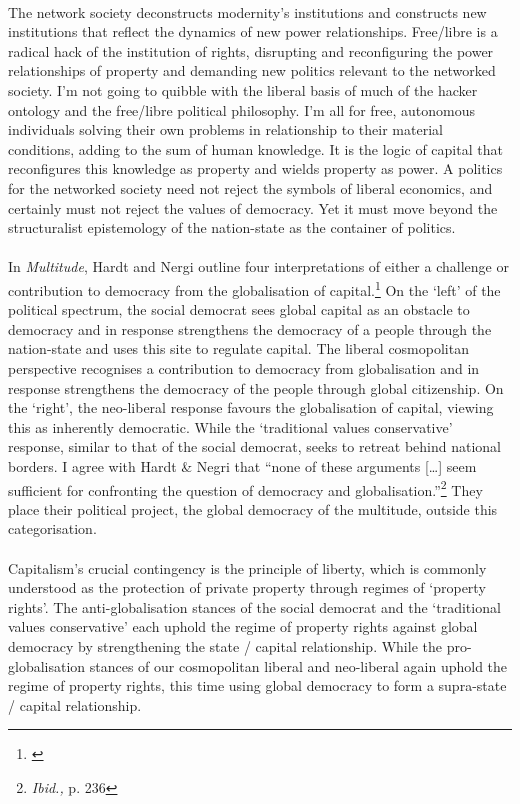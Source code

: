 \documentclass[11pt,titlepage]{book}
\begin{document}
\paragraph{}The network society deconstructs modernity's institutions and constructs new institutions that reflect the dynamics of new power relationships. Free/libre is a radical hack of the institution of rights, disrupting and reconfiguring the power relationships of property and demanding new politics relevant to the networked society. I'm not going to quibble with the liberal basis of much of the hacker ontology and the free/libre political philosophy. I'm all for free, autonomous individuals solving their own problems in relationship to their material conditions, adding to the sum of human knowledge. It is the logic of capital that reconfigures this knowledge as property and wields property as power. A politics for the networked society need not reject the symbols of liberal economics, and certainly must not reject the values of democracy. Yet it must move beyond the structuralist epistemology of the nation-state as the container of politics.

\paragraph{}In \textit{Multitude}, Hardt and Nergi outline four interpretations of either a challenge or contribution to democracy from the globalisation of capital.\footnote{\cite[pp. 232-236]{Hardt:2005zt}} On the `left' of the political spectrum, the social democrat sees global capital as an obstacle to democracy and in response strengthens the democracy of a people through the nation-state and uses this site to regulate capital. The liberal cosmopolitan perspective recognises a contribution to democracy from globalisation and in response strengthens the democracy of the people through global citizenship. On the `right', the neo-liberal response favours the globalisation of capital, viewing this as inherently democratic. While the `traditional values conservative' response, similar to that of the social democrat, seeks to retreat behind national borders. I agree with Hardt \& Negri that ``none of these arguments [\ldots] seem sufficient for confronting the question of democracy and globalisation.''\footnote{\textit{Ibid.,} p. 236} They place their political project, the global democracy of the multitude, outside this categorisation.

\paragraph{}Capitalism's crucial contingency is the principle of liberty, which is commonly understood as the protection of private property through regimes of `property rights'. The anti-globalisation stances of the social democrat and the `traditional values conservative' each uphold the regime of property rights against global democracy by strengthening the state / capital relationship. While the pro-globalisation stances of our cosmopolitan liberal and neo-liberal again uphold the regime of property rights, this time using global democracy to form a supra-state / capital relationship.
\end{document}
